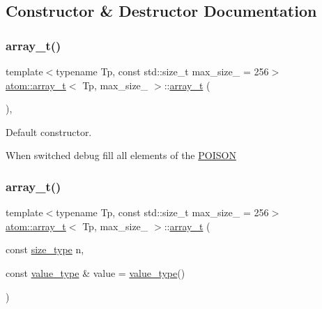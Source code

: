 \subsection{Constructor \& Destructor Documentation}
\mbox{\label{classatom_1_1array__t_ac909dffe60e64d871a3c23e74480cdf1}} 
\subsubsection{\texorpdfstring{array\+\_\+t()}{array\_t()}\hspace{0.1cm}{\footnotesize\ttfamily [1/2]}}
{\footnotesize\ttfamily template$<$typename Tp, const std\+::size\+\_\+t max\+\_\+size\+\_\+ = 256$>$ \\
\hyperlink{classatom_1_1array__t}{atom\+::array\+\_\+t}$<$ Tp, max\+\_\+size\+\_\+ $>$\+::\hyperlink{classatom_1_1array__t}{array\+\_\+t} (\begin{DoxyParamCaption}{ }\end{DoxyParamCaption})\hspace{0.3cm}{\ttfamily [inline]}, {\ttfamily [noexcept]}}



Default constructor. 

When switched debug fill all elements of the \hyperlink{struct_p_o_i_s_o_n}{P\+O\+I\+S\+ON} \mbox{\label{classatom_1_1array__t_a9f3f72a3c77e55f6f18bfcfb065b78b3}} 
\subsubsection{\texorpdfstring{array\+\_\+t()}{array\_t()}\hspace{0.1cm}{\footnotesize\ttfamily [2/2]}}
{\footnotesize\ttfamily template$<$typename Tp, const std\+::size\+\_\+t max\+\_\+size\+\_\+ = 256$>$ \\
\hyperlink{classatom_1_1array__t}{atom\+::array\+\_\+t}$<$ Tp, max\+\_\+size\+\_\+ $>$\+::\hyperlink{classatom_1_1array__t}{array\+\_\+t} (\begin{DoxyParamCaption}\item[{const \hyperlink{classatom_1_1array__t_a8534f23c7f0082698cbd708e1f2e26ff}{size\+\_\+type}}]{n,  }\item[{const \hyperlink{classatom_1_1array__t_aeb485cd6190dc11ddb8e7f48c09451c4}{value\+\_\+type} \&}]{value = {\ttfamily \hyperlink{classatom_1_1array__t_aeb485cd6190dc11ddb8e7f48c09451c4}{value\+\_\+type}()} }\end{DoxyParamCaption})\hspace{0.3cm}{\ttfamily [inline]}}




